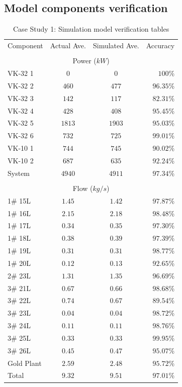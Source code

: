 \begin{appendices}
\chapter{\hspace{0.3cm}Model components verification}\label{Verification}
\newpage
\begin{table}[h!]
	\caption{Case Study 1: Simulation model verification tables}
	\centering
	\begin{tabular}{lccr}
		\hline 
		Component & Actual Ave. & Simulated  Ave. & Accuracy \\ \hhline{====} 
		\\
		\multicolumn{4}{c}{Power ($ kW $)}
		\\
		VK-32 1 & $  0  $ & $  0  $ & $ 100   $\% \\
		VK-32 2 & $ 460 $ & $ 477 $ & $ 96.35 $\% \\
		VK-32 3 & $ 142 $ & $ 117 $ & $ 82.31 $\% \\
		VK-32 4 & $ 428 $ & $ 408 $ & $ 95.45 $\% \\
		VK-32 5 & $ 1813$ & $ 1903$ & $ 95.03 $\% \\
		VK-32 6 & $ 732 $ & $ 725 $ & $ 99.01 $\% \\
		VK-10 1 & $ 744 $ & $ 745 $ & $ 90.02 $\% \\
		VK-10 2 & $ 687 $ & $ 635 $ & $ 92.24 $\% \\
		System  & $ 4940$ & $4911 $ & $ 97.34 $\% \\
		\\
		\multicolumn{4}{c}{Flow ($ kg/s $)}
		\\
		1\# 15L  & $ 1.45 $ & $ 1.42 $ & $ 97.87 $\% \\
		1\# 16L  & $ 2.15 $ & $ 2.18 $ & $ 98.48 $\% \\
		1\# 17L  & $ 0.34 $ & $ 0.35 $ & $ 97.30 $\% \\
		1\# 18L  & $ 0.38 $ & $ 0.39 $ & $ 97.39 $\% \\
		1\# 19L  & $ 0.31 $ & $ 0.31 $ & $ 98.77 $\% \\
		1\# 20L  & $ 0.12 $ & $ 0.13 $ & $ 92.65 $\% \\
		2\# 23L  & $ 1.31 $ & $ 1.35 $ & $ 96.69 $\% \\
		3\# 21L  & $ 0.67 $ & $ 0.66 $ & $ 98.68 $\% \\
		3\# 22L  & $ 0.74 $ & $ 0.67 $ & $ 89.54 $\% \\
		3\# 23L  & $ 0.04 $ & $ 0.04 $ & $ 98.72 $\% \\
		3\# 24L  & $ 0.11 $ & $ 0.11 $ & $ 98.76 $\% \\
		3\# 25L  & $ 0.33 $ & $ 0.33 $ & $ 99.95 $\% \\
		3\# 26L  & $ 0.45 $ & $ 0.47 $ & $ 95.07 $\% \\
		Gold Plant & $ 2.59 $ & $ 2.48 $ & $ 95.72 $\% \\
		Total  	 & $ 9.32$  & $9.51 $  & $ 97.01 $\% \\
		\hline 
	\end{tabular}
		

\end{table}
\end{appendices}
